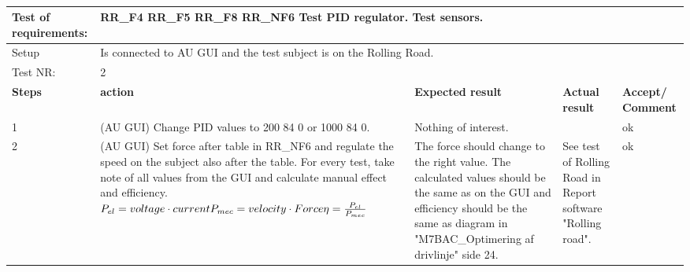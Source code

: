 \begin{table}[h!]
	\centering
	\label{my-label}	
	\begin{tabular}{|p{1.5 cm}|p{4.2 cm}|p{2.1 cm}|p{2.1 cm}|p{2.1 cm}|}
		\hline
		Test of requirements: 
		& \multicolumn{4}{l|}{RR\_F4 RR\_F5 RR\_F8 RR\_NF6 Test PID regulator. Test sensors.} \\ \hline
		Setup 
		& \multicolumn{4}{l|}{Is connected to AU GUI and the test subject is on the Rolling Road.} \\ \hline
		Test NR:
		& \multicolumn{4}{l|}{2} \\ \hline
		\textbf{Steps} & \textbf{action} & \textbf{Expected result} & 
		\textbf{Actual result} & \textbf{Accept/ Comment} \\ \hline
		1 
		& (AU GUI) Change PID values to 200 84 0 or 1000 84 0. 
		& Nothing of interest.
		& 
		& ok\\ \hline
		2
		& (AU GUI) Set force after table in RR\_NF6 and regulate the speed on the subject also after the table. For every test, take note of all values from the GUI and calculate manual effect and efficiency.\newline \newline
		$P_{el} = voltage \cdot current \newline \newline
		P_{mec} = velocity \cdot Force \newline \newline
		\eta = \frac{P_{el}}{P_{mec}}$ 
		& The force should change to the right value. The calculated values should be the same as on the GUI and efficiency should be the same as diagram in "M7BAC\_Optimering af drivlinje" side 24.
		& See test of Rolling Road in Report software "Rolling road".
		& ok \\ \hline
	\end{tabular}
	\caption{}
\end{table}

